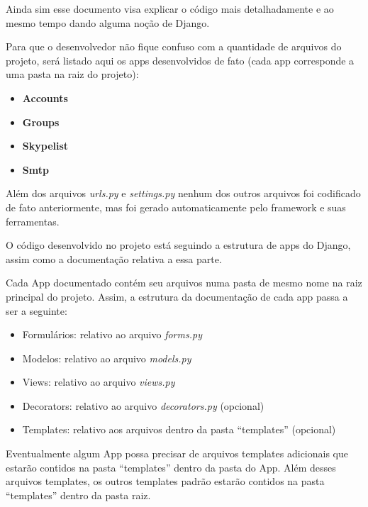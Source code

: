 \documentclass[letterpaper,10pt,brazil]{sphinxmanual}
\begin{document}
Ainda sim esse documento visa explicar o código mais detalhadamente e ao mesmo tempo dando alguma noção de Django.

Para que o desenvolvedor não fique confuso com a quantidade de arquivos do projeto, será listado aqui os apps desenvolvidos de fato (cada app corresponde a uma pasta na raiz do projeto):
\begin{itemize}
\item {} 
\textbf{Accounts}

\item {} 
\textbf{Groups}

\item {} 
\textbf{Skypelist}

\item {} 
\textbf{Smtp}

\end{itemize}

Além dos arquivos \emph{urls.py} e \emph{settings.py} nenhum dos outros arquivos foi codificado de fato anteriormente, mas foi gerado automaticamente pelo framework e suas ferramentas.

O código desenvolvido no projeto está seguindo a estrutura de apps do Django, assim como a documentação relativa a essa parte.

Cada App documentado contém seu arquivos numa pasta de mesmo nome na raiz principal do projeto. Assim, a estrutura da documentação de cada app passa a ser a seguinte:
\begin{itemize}
\item {} 
Formulários: relativo ao arquivo \emph{forms.py}

\item {} 
Modelos: relativo ao arquivo \emph{models.py}

\item {} 
Views: relativo ao arquivo \emph{views.py}

\item {} 
Decorators: relativo ao arquivo \emph{decorators.py} (opcional)

\item {} 
Templates: relativo aos arquivos dentro da pasta ``templates'' (opcional)

\end{itemize}

Eventualmente algum App possa precisar de arquivos templates adicionais que estarão contidos na pasta ``templates'' dentro da pasta do App. Além desses arquivos templates, os outros templates padrão estarão contidos na pasta ``templates'' dentro da pasta raiz.
\end{document}
